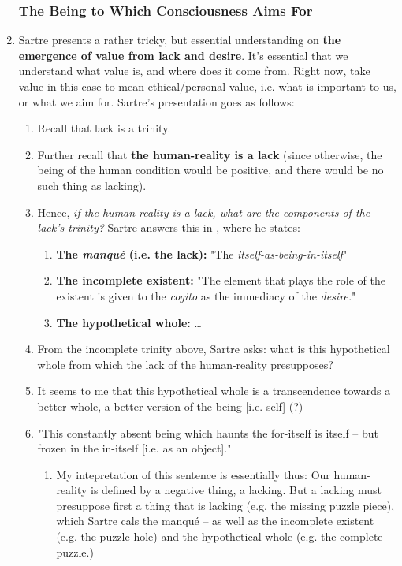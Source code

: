 \begin{enumerate}
  \subsubsection*{The Being to Which Consciousness Aims For}
  \item Sartre presents a rather tricky, but essential understanding on \textbf{the emergence of value from lack and desire}. It's essential that we understand what value is, and where does it come from. Right now, take value in this case to mean ethical/personal value, i.e. what is important to us, or what we aim for. Sartre's presentation goes as follows:
  \begin{enumerate}
    \item Recall that lack is a trinity.
    \item Further recall that \textbf{the human-reality is a lack} (since otherwise, the being of the human condition would be positive, and there would be no such thing as lacking).
    \item Hence, \emph{if the human-reality is a lack, what are the components of the lack's trinity?} Sartre answers this in \autocite[140]{sartre}, where he states:
    \begin{enumerate}
      \item \textbf{The \emph{manqué} (i.e. the lack):} "The \emph{itself-as-being-in-itself}" \autocite[141]{sartre}
      \item \textbf{The incomplete existent:} "The element that plays the role of the existent is given to the \emph{cogito} as the immediacy of the \emph{desire.}" \autocite[140]{sartre}
      \item \textbf{The hypothetical whole:} \ldots
    \end{enumerate}
    \item From the incomplete trinity above, Sartre asks: what is this hypothetical whole from which the lack of the human-reality presupposes?
    \item It seems to me that this hypothetical whole is a transcendence towards a better whole, a better version of the being [i.e. self] (?)
    \item "This constantly absent being which haunts the for-itself is itself -- but frozen in the in-itself [i.e. as an object]." \autocite[142]{sartre}
    \begin{enumerate}
      \item My intepretation of this sentence is essentially thus: Our human-reality is defined by a negative thing, a lacking. But a lacking must presuppose first a thing that is lacking (e.g. the missing puzzle piece), which Sartre cals the manqué -- as well as the incomplete existent (e.g. the puzzle-hole) and the hypothetical whole (e.g. the complete puzzle.)

\end{enumerate}
\end{enumerate}
\end{enumerate}
